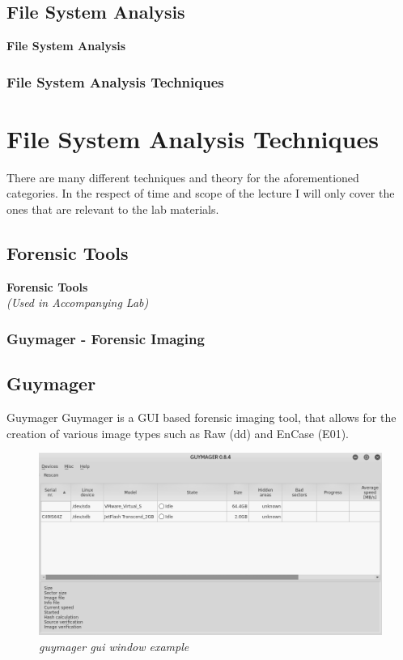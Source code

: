 \documentclass{beamer}
\begin{document}
\begin{frame}%
	\section{File System Analysis}
	\begin{center}
		\Huge\textbf{File System Analysis}
	\end{center}
\end{frame}

\begin{frame}
	\frametitle{File System Analysis Techniques}
	\section*{File System Analysis Techniques}
	There are many different techniques and theory for the aforementioned categories. In the respect of time and scope of the lecture I will only cover the ones that are relevant to the lab materials.
\end{frame}

\begin{frame}%
	\section{Forensic Tools}
	\begin{center}
		\Huge\textbf{Forensic Tools}\\
		\large\textit{(Used in Accompanying Lab)}
	\end{center}
\end{frame}

\begin{frame}
	\frametitle{Guymager - Forensic Imaging}
	\subsection*{Guymager}
	\begin{block}{Guymager}
		Guymager is a GUI based forensic imaging tool, that allows for the creation of various image types such as Raw (dd) and EnCase (E01).
	\end{block}
	\begin{figure}[h]
		\centering
		\includegraphics[scale=0.3]{guymager-window}
		\caption{\textit{guymager gui window example}}
		\label{fig:guymager-main-window}
	\end{figure}
\end{frame}
\end{document}
